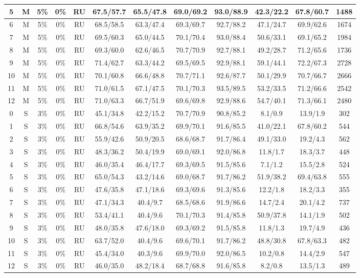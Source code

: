 \begin{table*}
{\begin{tabular}{|c|c|c|c|c||c|c|c|c|c|c||c|}
5 & M & 5\% & 0\% & RU & 67.5/57.7 & 65.5/47.8 & 69.0/69.2 & 93.0/88.9 & 42.3/22.2 & 67.8/60.7 & 1488 \\ \hline
6 & M & 5\% & 0\% & RU & 68.5/58.5 & 63.3/47.4 & 69.3/69.7 & 92.7/88.2 & 47.1/24.7 & 69.9/62.6 & 1674 \\ \hline
7 & M & 5\% & 0\% & RU & 69.5/60.3 & 65.0/44.5 & 70.1/70.4 & 93.0/88.4 & 50.6/33.1 & 69.1/65.2 & 1984 \\ \hline
8 & M & 5\% & 0\% & RU & 69.3/60.0 & 62.6/46.5 & 70.7/70.9 & 92.7/88.1 & 49.2/28.7 & 71.2/65.6 & 1736 \\ \hline
9 & M & 5\% & 0\% & RU & 71.4/62.7 & 63.3/44.2 & 69.5/69.5 & 92.9/88.1 & 59.1/44.1 & 72.2/67.3 & 2728 \\ \hline
10 & M & 5\% & 0\% & RU & 70.1/60.8 & 66.6/48.8 & 70.7/71.1 & 92.6/87.7 & 50.1/29.9 & 70.7/66.7 & 2666 \\ \hline
11 & M & 5\% & 0\% & RU & 71.0/61.5 & 67.1/47.5 & 70.1/70.3 & 93.5/89.5 & 53.2/33.5 & 71.2/66.6 & 2542 \\ \hline
12 & M & 5\% & 0\% & RU & 71.0/63.3 & 66.7/51.9 & 69.6/69.8 & 92.9/88.6 & 54.7/40.1 & 71.3/66.1 & 2480 \\ \hline
0 & S & 3\% & 0\% & RU & 45.1/34.8 & 42.2/15.2 & 70.7/70.9 & 90.8/85.2 & 8.1/0.9 & 13.9/1.9 & 302 \\ \hline
1 & S & 3\% & 0\% & RU & 66.8/54.6 & 63.9/35.2 & 69.9/70.1 & 91.6/85.5 & 41.0/22.1 & 67.8/60.2 & 544 \\ \hline
2 & S & 3\% & 0\% & RU & 55.9/42.6 & 50.9/20.5 & 68.6/68.7 & 91.7/86.4 & 49.1/33.0 & 19.2/4.3 & 562 \\ \hline
3 & S & 3\% & 0\% & RU & 48.3/36.2 & 50.4/19.9 & 69.0/69.1 & 92.0/86.8 & 11.8/1.7 & 18.3/3.7 & 448 \\ \hline
4 & S & 3\% & 0\% & RU & 46.0/35.4 & 46.4/17.7 & 69.3/69.5 & 91.5/85.6 & 7.1/1.2 & 15.5/2.8 & 524 \\ \hline
5 & S & 3\% & 0\% & RU & 65.0/54.3 & 43.2/14.6 & 69.0/68.7 & 91.7/86.2 & 51.9/38.2 & 69.4/63.8 & 555 \\ \hline
6 & S & 3\% & 0\% & RU & 47.6/35.8 & 47.1/18.6 & 69.3/69.6 & 91.3/85.6 & 12.2/1.8 & 18.2/3.3 & 355 \\ \hline
7 & S & 3\% & 0\% & RU & 47.1/34.3 & 40.4/9.7 & 68.5/68.6 & 91.9/86.6 & 14.7/2.4 & 20.1/4.2 & 737 \\ \hline
8 & S & 3\% & 0\% & RU & 53.4/41.1 & 40.4/9.6 & 70.1/70.3 & 91.4/85.8 & 50.9/37.8 & 14.1/1.9 & 502 \\ \hline
9 & S & 3\% & 0\% & RU & 48.0/35.8 & 47.6/18.0 & 69.3/69.2 & 91.5/85.8 & 11.8/1.3 & 19.7/4.9 & 436 \\ \hline
10 & S & 3\% & 0\% & RU & 63.7/52.0 & 40.4/9.6 & 69.6/70.1 & 91.7/86.2 & 48.8/30.8 & 67.8/63.3 & 482 \\ \hline
11 & S & 3\% & 0\% & RU & 45.4/34.0 & 40.3/9.6 & 69.9/70.0 & 92.0/86.5 & 10.2/0.8 & 14.4/2.9 & 547 \\ \hline
12 & S & 3\% & 0\% & RU & 46.0/35.0 & 48.2/18.4 & 68.7/68.8 & 91.6/85.8 & 8.2/0.8 & 13.5/1.3 & 489 \\ \hline
\end{tabular}}
\end{table*}

